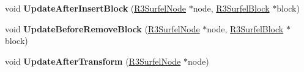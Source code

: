 \begin{DoxyCompactItemize}
\item 
void {\bfseries Update\+After\+Insert\+Block} (\hyperlink{class_r3_surfel_node}{R3\+Surfel\+Node} $\ast$node, \hyperlink{class_r3_surfel_block}{R3\+Surfel\+Block} $\ast$block)\hypertarget{class_r3_surfel_object_ad614eaafeaa307cb55db132a1b9dfc32}{}\label{class_r3_surfel_object_ad614eaafeaa307cb55db132a1b9dfc32}

\item 
void {\bfseries Update\+Before\+Remove\+Block} (\hyperlink{class_r3_surfel_node}{R3\+Surfel\+Node} $\ast$node, \hyperlink{class_r3_surfel_block}{R3\+Surfel\+Block} $\ast$block)\hypertarget{class_r3_surfel_object_a737953c680f5f9d77801d2b30c1fca40}{}\label{class_r3_surfel_object_a737953c680f5f9d77801d2b30c1fca40}

\item 
void {\bfseries Update\+After\+Transform} (\hyperlink{class_r3_surfel_node}{R3\+Surfel\+Node} $\ast$node)\hypertarget{class_r3_surfel_object_a027ecda7be743397b6549767ce8aebd2}{}\label{class_r3_surfel_object_a027ecda7be743397b6549767ce8aebd2}

\end{DoxyCompactItemize}
